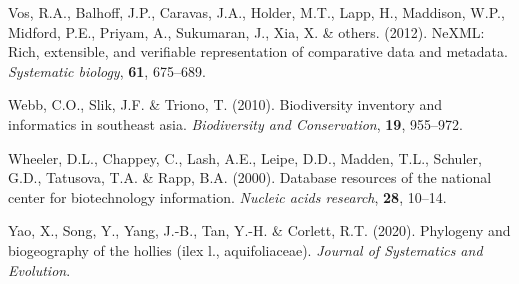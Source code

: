 \documentclass[]{article}
\begin{document}
\leavevmode\hypertarget{ref-vos2012nexml}{}%
Vos, R.A., Balhoff, J.P., Caravas, J.A., Holder, M.T., Lapp, H., Maddison, W.P., Midford, P.E., Priyam, A., Sukumaran, J., Xia, X. \& others. (2012). NeXML: Rich, extensible, and verifiable representation of comparative data and metadata. \emph{Systematic biology}, \textbf{61}, 675--689.

\leavevmode\hypertarget{ref-webb2010biodiversity}{}%
Webb, C.O., Slik, J.F. \& Triono, T. (2010). Biodiversity inventory and informatics in southeast asia. \emph{Biodiversity and Conservation}, \textbf{19}, 955--972.

\leavevmode\hypertarget{ref-wheeler2000database}{}%
Wheeler, D.L., Chappey, C., Lash, A.E., Leipe, D.D., Madden, T.L., Schuler, G.D., Tatusova, T.A. \& Rapp, B.A. (2000). Database resources of the national center for biotechnology information. \emph{Nucleic acids research}, \textbf{28}, 10--14.

\leavevmode\hypertarget{ref-yao2020phylogeny}{}%
Yao, X., Song, Y., Yang, J.-B., Tan, Y.-H. \& Corlett, R.T. (2020). Phylogeny and biogeography of the hollies (ilex l., aquifoliaceae). \emph{Journal of Systematics and Evolution}.
\end{document}
